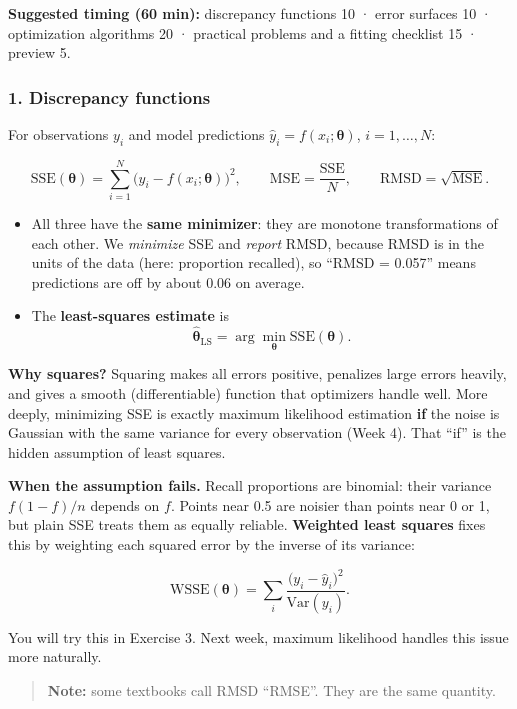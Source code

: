 \textbf{Suggested timing (60 min):} discrepancy functions 10 · error
surfaces 10 · optimization algorithms 20 · practical problems and a
fitting checklist 15 · preview 5.

\subsubsection{1. Discrepancy functions}

For observations \(y_i\) and model predictions
\(\hat y_i = f(x_i; \boldsymbol\theta)\), \(i = 1, \dots, N\):

\[
\mathrm{SSE}(\boldsymbol\theta) = \sum_{i=1}^{N} \big(y_i - f(x_i;\boldsymbol\theta)\big)^2, \qquad
\mathrm{MSE} = \frac{\mathrm{SSE}}{N}, \qquad
\mathrm{RMSD} = \sqrt{\mathrm{MSE}}.
\]

\begin{itemize}
\tightlist
\item
  All three have the \textbf{same minimizer}: they are monotone
  transformations of each other. We \emph{minimize} SSE and
  \emph{report} RMSD, because RMSD is in the units of the data (here:
  proportion recalled), so ``RMSD = 0.057'' means predictions are off by
  about 0.06 on average.
\item
  The \textbf{least-squares estimate} is \[
  \hat{\boldsymbol\theta}_{\text{LS}} = \arg\min_{\boldsymbol\theta} \mathrm{SSE}(\boldsymbol\theta).
  \]
\end{itemize}

\textbf{Why squares?} Squaring makes all errors positive, penalizes
large errors heavily, and gives a smooth (differentiable) function that
optimizers handle well. More deeply, minimizing SSE is exactly maximum
likelihood estimation \textbf{if} the noise is Gaussian with the same
variance for every observation (Week 4). That ``if'' is the hidden
assumption of least squares.

\textbf{When the assumption fails.} Recall proportions are binomial:
their variance \(f(1-f)/n\) depends on \(f\). Points near 0.5 are
noisier than points near 0 or 1, but plain SSE treats them as equally
reliable. \textbf{Weighted least squares} fixes this by weighting each
squared error by the inverse of its variance:

\[
\mathrm{WSSE}(\boldsymbol\theta) = \sum_{i} \frac{\big(y_i - \hat y_i\big)^2}{\mathrm{Var}(y_i)}.
\]

You will try this in Exercise 3. Next week, maximum likelihood handles
this issue more naturally.

\begin{quote}
\textbf{Note:} some textbooks call RMSD ``RMSE''. They are the same
quantity.
\end{quote}

